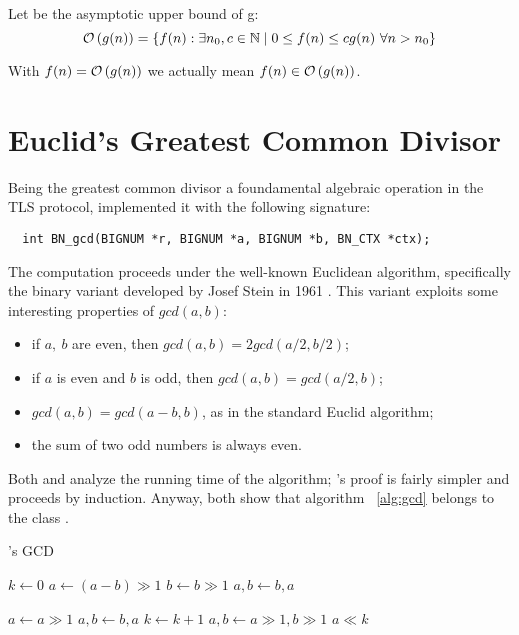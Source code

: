 Let  be the asymptotic upper bound of g:
$$
\mathcal{O}\left(g(n)\right) = \{ f(n) : \exists n_0, c \in \mathbb{N} \mid 0 \leq f(n) \leq cg(n)
\ \forall n > n_0 \}
$$

With $f(n) = \mathcal{O}\left(g(n)\right)$ we actually mean
$f(n) \in \mathcal{O}\left(g(n)\right)$.

\section{Euclid's Greatest Common Divisor \label{sec:preq:gcd}}

Being the greatest common divisor a foundamental algebraic operation in the TLS
protocol, \openssl implemented it with the following signature:

\begin{verbatim}
  int BN_gcd(BIGNUM *r, BIGNUM *a, BIGNUM *b, BN_CTX *ctx);
\end{verbatim}

The computation proceeds under the well-known Euclidean algorithm, specifically
the binary variant developed by Josef Stein in 1961 \cite{AOCPv2}. This variant
exploits some interesting properties of $gcd(a, b)$:
\begin{itemize}
  \setlength{\itemsep}{1pt}
  \setlength{\parskip}{0pt}
  \setlength{\parsep}{0pt}
  \item if $a,\ b$ are even, then $gcd(a, b) = 2gcd(a/2, b/2)$;
  \item if $a$ is even and $b$ is odd, then $gcd(a, b) = gcd(a/2, b)$;
  \item  $gcd(a, b) = gcd(a-b, b)$, as in the standard Euclid algorithm;
  \item the sum of two odd numbers is always even.
\end{itemize}

Both \cite{AOCPv2} and \cite{MITalg} analyze the running time of the
algorithm; \cite{MITalg}'s proof is fairly simpler and proceeds %
by induction.
Anyway, both show that algorithm ~\ref{alg:gcd} belongs to the class
.

\begin{algorithm}[H]
  \caption{\openssl's GCD \label{alg:gcd}}
  \begin{algorithmic}[1]
    \State $k \gets 0$
          \State $a \gets (a-b) \gg 1$
        \Else
          \State $b \gets b \gg 1$
        \EndIf
         $a, b \gets b, a$ \EndIf

      \Else
          \State $a \gets a \gg 1$
           $a, b \gets b, a$ \EndIf
        \Else
          \State $k \gets k+1$
          \State $a, b \gets a \gg 1, b \gg 1$
        \EndIf
      \EndIf
    \EndWhile
    \State \Return $a \ll k$

  \end{algorithmic}
\end{algorithm}

